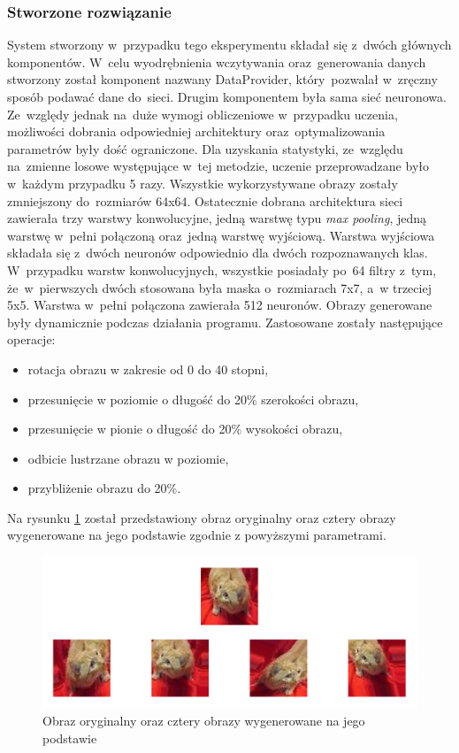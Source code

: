 \subsubsection{Stworzone rozwiązanie}
System stworzony w~przypadku tego eksperymentu składał się z~dwóch głównych komponentów. W~celu wyodrębnienia wczytywania oraz~generowania danych stworzony został komponent nazwany DataProvider, który~pozwalał w~zręczny sposób podawać dane do~sieci. Drugim komponentem była sama sieć neuronowa. Ze~względy jednak na~duże wymogi obliczeniowe w~przypadku uczenia, możliwości dobrania odpowiedniej architektury oraz~optymalizowania parametrów były dość ograniczone. Dla uzyskania statystyki, ze~względu na~zmienne losowe występujące w~tej metodzie, uczenie przeprowadzane było w~każdym przypadku 5 razy. Wszystkie wykorzystywane obrazy zostały zmniejszony do~rozmiarów 64x64. Ostatecznie dobrana architektura sieci zawierała trzy warstwy konwolucyjne, jedną warstwę typu \textit{max pooling}, jedną warstwę w~pełni połączoną  oraz~jedną warstwę wyjściową. Warstwa wyjściowa składała się z~dwóch neuronów odpowiednio dla dwóch rozpoznawanych klas. W~przypadku warstw konwolucyjnych, wszystkie posiadały po~64 filtry z~tym, że~w~pierwszych dwóch stosowana była maska o~rozmiarach 7x7, a~w trzeciej 5x5.  Warstwa w~pełni połączona zawierała 512 neuronów. Obrazy generowane były dynamicznie podczas działania programu. Zastosowane zostały następujące operacje:
\begin{itemize}
\item rotacja obrazu w zakresie od 0 do 40 stopni,
\item przesunięcie w poziomie o długość do 20\% szerokości obrazu,
\item przesunięcie w pionie o długość do 20\% wysokości obrazu,
\item odbicie lustrzane obrazu w poziomie,
\item przybliżenie obrazu do 20\%.
\end{itemize}
Na rysunku \ref{catdogsimages} został przedstawiony obraz oryginalny oraz cztery obrazy wygenerowane na jego podstawie zgodnie z powyższymi parametrami.

\begin{figure}[ht!]
\centering
\includegraphics[scale=0.4]{res/catdogsaug.png}
\caption[Caption for LOF]{Obraz oryginalny oraz cztery obrazy wygenerowane na jego podstawie \label{catdogsimages}}
\end{figure} 

